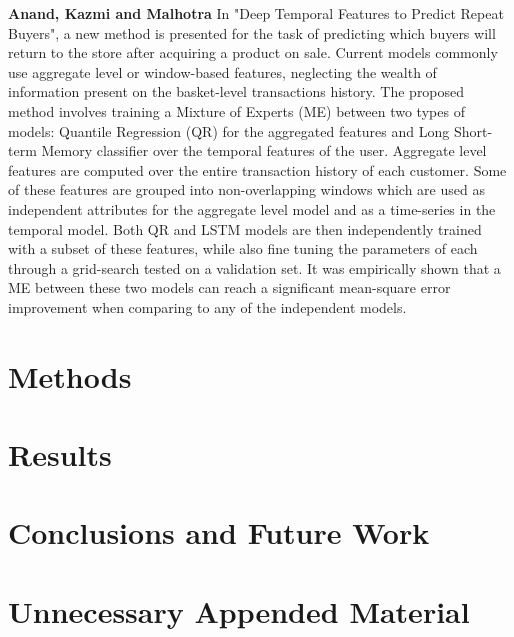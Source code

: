 \documentclass{kththesis}
\begin{document}
\textbf{Anand, Kazmi and Malhotra} \citep{Auon2015} In "Deep Temporal Features to Predict Repeat Buyers", a new method is presented for the task of predicting which buyers will return to the store after acquiring a product on sale. Current models commonly use aggregate level or window-based features, neglecting the wealth of information present on the basket-level transactions history. The proposed method involves training a Mixture of Experts (ME) between two types of models: Quantile Regression (QR) for the aggregated features and Long Short-term Memory classifier over the temporal features of the user. Aggregate level features are computed over the entire transaction history of each customer. Some of these features are grouped into non-overlapping windows which are used as independent attributes for the aggregate level model and as a time-series in the temporal model. Both QR and LSTM models are then independently trained with a subset of these features, while also fine tuning the parameters of each through a grid-search tested on a validation set. It was empirically shown that a ME between these two models can reach a significant mean-square error improvement when comparing to any of the independent models.

\chapter{Methods}

\lipsum

\chapter{Results}

\lipsum

\chapter{Conclusions and Future Work}

\lipsum[5]



\appendix

\chapter{Unnecessary Appended Material}
\end{document}
